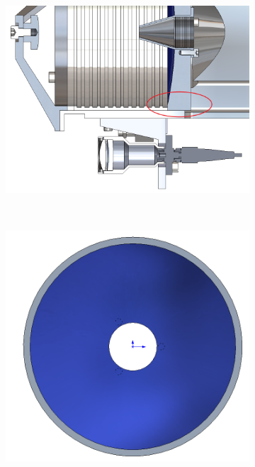\begin{figure}[!htbp]
	\centering
	\begin{subfigure}[c]{0.5\textwidth}
		\includegraphics[width=\textwidth]{./Img/RCzhujing001.png}
		\caption{}
		\label{RCzhujing001.png}
	\end{subfigure}%
	~%
	\begin{subfigure}[c]{0.5\textwidth}
		\includegraphics[width=\textwidth]{./Img/RCzhujing002.png}
		\caption{}
		\label{RCzhujing002.png}
	\end{subfigure}
	\label{fig:MAIN-MIRROR}
\end{figure}

